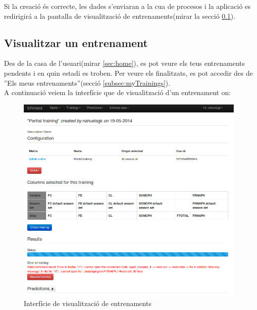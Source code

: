 Si la creaci\'{o} \'e{s} correcte, les dades s'enviaran a la cua de procesos i la aplicaci\'{o} es redirigir\'{a} a la pantalla de visualitzaci\'{o} de entrenaments(mirar la secció \ref{subsec:viewtraining}).

\subsection{Visualitzar un entrenament}
\label{subsec:viewtraining}
Des de la casa de l'usuari(mirar \ref{sec:home}), es pot veure els teus entrenaments pendents i en quin estadi es troben. Per veure els finalitzats, es pot accedir des de ''Els meus entrenaments''(secció \ref{subsec:myTrainings}).\\

A continuació veiem la interfície que de visualització d'un entrenament on:
\begin{figure}[h!]
  \centering
  \includegraphics[scale=0.5]{img/userguide/view_training_pending.png}
  \caption{Interfície de visualització de entrenaments}
  \label{fig:viewTraining}
\end{figure}

